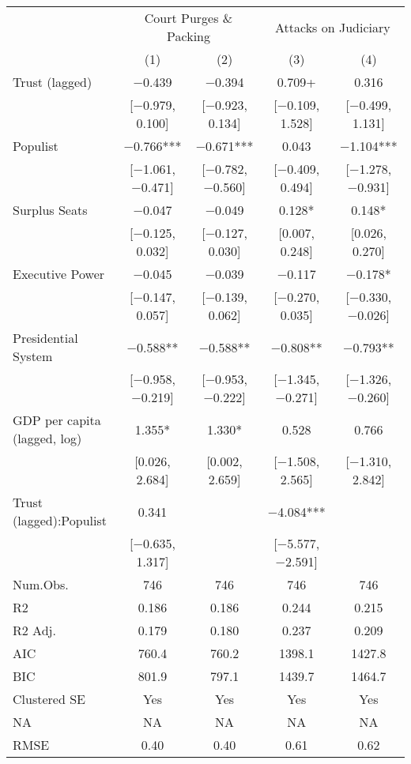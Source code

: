 \begin{table}
\centering\centering\centering
\begin{tabular}[t]{lcccc}
\toprule
\multicolumn{1}{c}{ } & \multicolumn{2}{c}{Court Purges \& Packing} & \multicolumn{2}{c}{Attacks on Judiciary} \\
\cmidrule(l{3pt}r{3pt}){2-3} \cmidrule(l{3pt}r{3pt}){4-5}
  & (1) & (2) & (3) & (4)\\
\midrule
Trust (lagged) & \num{-0.439} & \num{-0.394} & \num{0.709}+ & \num{0.316}\\
 & {}[\num{-0.979}, \num{0.100}] & {}[\num{-0.923}, \num{0.134}] & {}[\num{-0.109}, \num{1.528}] & {}[\num{-0.499}, \num{1.131}]\\
Populist & \num{-0.766}*** & \num{-0.671}*** & \num{0.043} & \num{-1.104}***\\
 & {}[\num{-1.061}, \num{-0.471}] & {}[\num{-0.782}, \num{-0.560}] & {}[\num{-0.409}, \num{0.494}] & {}[\num{-1.278}, \num{-0.931}]\\
Surplus Seats & \num{-0.047} & \num{-0.049} & \num{0.128}* & \num{0.148}*\\
 & {}[\num{-0.125}, \num{0.032}] & {}[\num{-0.127}, \num{0.030}] & {}[\num{0.007}, \num{0.248}] & {}[\num{0.026}, \num{0.270}]\\
Executive Power & \num{-0.045} & \num{-0.039} & \num{-0.117} & \num{-0.178}*\\
 & {}[\num{-0.147}, \num{0.057}] & {}[\num{-0.139}, \num{0.062}] & {}[\num{-0.270}, \num{0.035}] & {}[\num{-0.330}, \num{-0.026}]\\
Presidential System & \num{-0.588}** & \num{-0.588}** & \num{-0.808}** & \num{-0.793}**\\
 & {}[\num{-0.958}, \num{-0.219}] & {}[\num{-0.953}, \num{-0.222}] & {}[\num{-1.345}, \num{-0.271}] & {}[\num{-1.326}, \num{-0.260}]\\
GDP per capita (lagged, log) & \num{1.355}* & \num{1.330}* & \num{0.528} & \num{0.766}\\
 & {}[\num{0.026}, \num{2.684}] & {}[\num{0.002}, \num{2.659}] & {}[\num{-1.508}, \num{2.565}] & {}[\num{-1.310}, \num{2.842}]\\
Trust (lagged):Populist & \num{0.341} &  & \num{-4.084}*** & \\
 & {}[\num{-0.635}, \num{1.317}] &  & {}[\num{-5.577}, \num{-2.591}] & \\
\midrule
Num.Obs. & \num{746} & \num{746} & \num{746} & \num{746}\\
R2 & \num{0.186} & \num{0.186} & \num{0.244} & \num{0.215}\\
R2 Adj. & \num{0.179} & \num{0.180} & \num{0.237} & \num{0.209}\\
AIC & \num{760.4} & \num{760.2} & \num{1398.1} & \num{1427.8}\\
BIC & \num{801.9} & \num{797.1} & \num{1439.7} & \num{1464.7}\\
Clustered SE & Yes & Yes & Yes & Yes\\
NA & NA & NA & NA & NA\\
RMSE & \num{0.40} & \num{0.40} & \num{0.61} & \num{0.62}\\
\bottomrule
\end{tabular}
\end{table}
